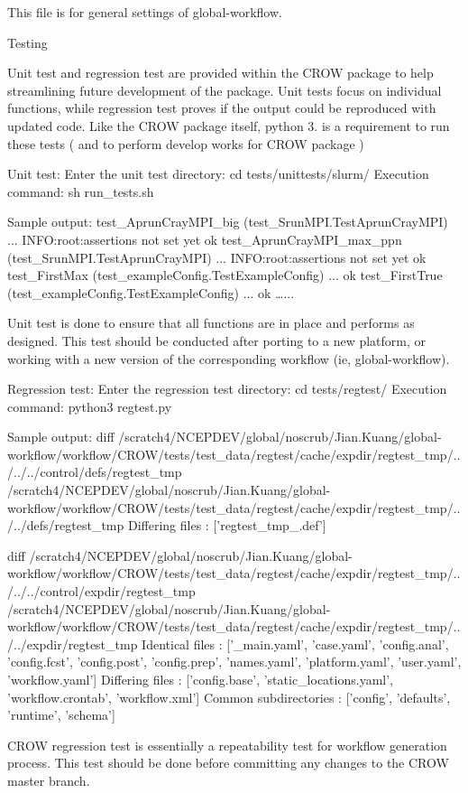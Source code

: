 This file is for general settings of global-\/workflow.

Testing

Unit test and regression test are provided within the C\-R\-O\-W package to help streamlining future development of the package. Unit tests focus on individual functions, while regression test proves if the output could be reproduced with updated code. Like the C\-R\-O\-W package itself, python 3. is a requirement to run these tests ( and to perform develop works for C\-R\-O\-W package )

Unit test\-: Enter the unit test directory\-: cd tests/unittests/slurm/ Execution command\-: sh run\-\_\-tests.\-sh

Sample output\-: test\-\_\-\-Aprun\-Cray\-M\-P\-I\-\_\-big (test\-\_\-\-Srun\-M\-P\-I.\-Test\-Aprun\-Cray\-M\-P\-I) ... I\-N\-F\-O\-:root\-:assertions not set yet ok test\-\_\-\-Aprun\-Cray\-M\-P\-I\-\_\-max\-\_\-ppn (test\-\_\-\-Srun\-M\-P\-I.\-Test\-Aprun\-Cray\-M\-P\-I) ... I\-N\-F\-O\-:root\-:assertions not set yet ok test\-\_\-\-First\-Max (test\-\_\-example\-Config.\-Test\-Example\-Config) ... ok test\-\_\-\-First\-True (test\-\_\-example\-Config.\-Test\-Example\-Config) ... ok …...

Unit test is done to ensure that all functions are in place and performs as designed. This test should be conducted after porting to a new platform, or working with a new version of the corresponding workflow (ie, global-\/workflow).

Regression test\-: Enter the regression test directory\-: cd tests/regtest/ Execution command\-: python3 regtest.\-py

Sample output\-: diff /scratch4/\-N\-C\-E\-P\-D\-E\-V/global/noscrub/\-Jian.Kuang/global-\/workflow/workflow/\-C\-R\-O\-W/tests/test\-\_\-data/regtest/cache/expdir/regtest\-\_\-tmp/../../../control/defs/regtest\-\_\-tmp /scratch4/\-N\-C\-E\-P\-D\-E\-V/global/noscrub/\-Jian.Kuang/global-\/workflow/workflow/\-C\-R\-O\-W/tests/test\-\_\-data/regtest/cache/expdir/regtest\-\_\-tmp/../../defs/regtest\-\_\-tmp Differing files \-: \mbox{[}'regtest\-\_\-tmp\-\_.\-def'\mbox{]}

diff /scratch4/\-N\-C\-E\-P\-D\-E\-V/global/noscrub/\-Jian.Kuang/global-\/workflow/workflow/\-C\-R\-O\-W/tests/test\-\_\-data/regtest/cache/expdir/regtest\-\_\-tmp/../../../control/expdir/regtest\-\_\-tmp /scratch4/\-N\-C\-E\-P\-D\-E\-V/global/noscrub/\-Jian.Kuang/global-\/workflow/workflow/\-C\-R\-O\-W/tests/test\-\_\-data/regtest/cache/expdir/regtest\-\_\-tmp/../../expdir/regtest\-\_\-tmp Identical files \-: \mbox{[}'\-\_\-main.\-yaml', 'case.\-yaml', 'config.\-anal', 'config.\-fcst', 'config.\-post', 'config.\-prep', 'names.\-yaml', 'platform.\-yaml', 'user.\-yaml', 'workflow.\-yaml'\mbox{]} Differing files \-: \mbox{[}'config.\-base', 'static\-\_\-locations.\-yaml', 'workflow.\-crontab', 'workflow.\-xml'\mbox{]} Common subdirectories \-: \mbox{[}'config', 'defaults', 'runtime', 'schema'\mbox{]}

C\-R\-O\-W regression test is essentially a repeatability test for workflow generation process. This test should be done before committing any changes to the C\-R\-O\-W master branch. 